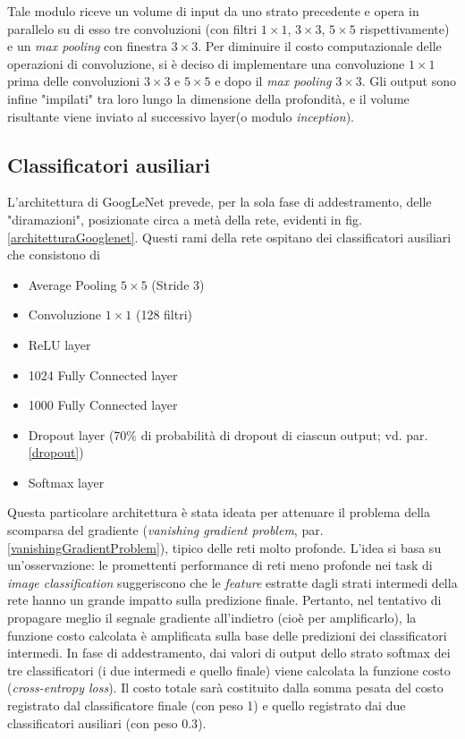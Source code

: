 Tale modulo riceve un volume di input da uno strato precedente e opera in parallelo su di esso tre convoluzioni (con filtri $1\times 1$, $3\times 3$, $5\times 5$ rispettivamente) e un \textit{max pooling} con finestra $3\times 3$. Per diminuire il costo computazionale delle operazioni di convoluzione, si è deciso di implementare una convoluzione $1\times 1$ prima delle convoluzioni $3\times 3$ e $5\times 5$ e dopo il \textit{max pooling} $3\times 3$.
Gli output sono infine "impilati" tra loro lungo la dimensione della profondità, e il volume risultante viene inviato al successivo layer(o modulo \textit{inception}).

\subsection{Classificatori ausiliari}
\label{classificatoriAusiliari}
L'architettura di GoogLeNet prevede, per la sola fase di addestramento, delle "diramazioni", posizionate circa a metà della rete, evidenti in fig. \ref{architetturaGooglenet}.
Questi rami della rete ospitano dei classificatori ausiliari che consistono di
\begin{itemize}
\item Average Pooling $5\times 5$ (Stride 3)
\item Convoluzione $1\times 1$ (128 filtri)
\item ReLU layer
\item 1024 Fully Connected layer
\item 1000 Fully Connected layer
\item Dropout layer (70\% di probabilità di dropout di ciascun output; vd. par. \ref{dropout})
\item Softmax layer
\end{itemize}
Questa particolare architettura è stata ideata per attenuare il problema della scomparsa del gradiente (\textit{vanishing gradient problem}, par. \ref{vanishingGradientProblem}), tipico delle reti molto profonde. L'idea si basa su un'osservazione: le promettenti performance di reti meno profonde nei task di \textit{image classification} suggeriscono che le \textit{feature} estratte dagli strati intermedi della rete hanno un grande impatto sulla predizione finale. Pertanto, nel tentativo di propagare meglio il segnale gradiente all'indietro (cioè per amplificarlo), la funzione costo calcolata è amplificata sulla base delle predizioni dei classificatori intermedi.
In fase di addestramento, dai valori di output dello strato softmax dei tre classificatori (i due intermedi e quello finale) viene calcolata la funzione costo (\textit{cross-entropy loss}). 
Il costo totale sarà costituito dalla somma pesata del costo registrato dal classificatore finale (con peso 1) e quello registrato dai due classificatori ausiliari (con peso $0.3$).

